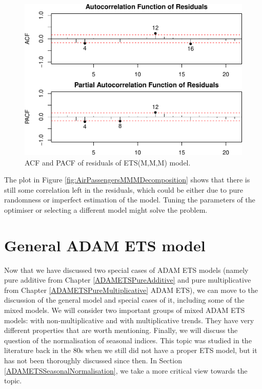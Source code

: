 \documentclass[
]{book}
\theoremstyle{definition}
\theoremstyle{definition}
\theoremstyle{definition}
\theoremstyle{definition}
\theoremstyle{remark}
\begin{document}
\begin{figure}
\centering
\includegraphics{Svetunkov--2022----ADAM_files/figure-latex/AirPassengersMMMACFPACF-1.pdf}
\caption{\label{fig:AirPassengersMMMACFPACF}ACF and PACF of residuals of ETS(M,M,M) model.}
\end{figure}

The plot in Figure \ref{fig:AirPassengersMMMDecomposition} shows that there is still some correlation left in the residuals, which could be either due to pure randomness or imperfect estimation of the model. Tuning the parameters of the optimiser or selecting a different model might solve the problem.

\hypertarget{ADAMETSOther}{%
\chapter{General ADAM ETS model}\label{ADAMETSOther}}

Now that we have discussed two special cases of ADAM ETS models (namely pure additive from Chapter \ref{ADAMETSPureAdditive} and pure multiplicative from Chapter \ref{ADAMETSPureMultiplicative} ADAM ETS), we can move to the discussion of the general model and special cases of it, including some of the mixed models. We will consider two important groups of mixed ADAM ETS models: with non-multiplicative and with multiplicative trends. They have very different properties that are worth mentioning. Finally, we will discuss the question of the normalisation of seasonal indices. This topic was studied in the literature back in the 80s when we still did not have a proper ETS model, but it has not been thoroughly discussed since then. In Section \ref{ADAMETSSeasonalNormalisation}, we take a more critical view towards the topic.
\end{document}
